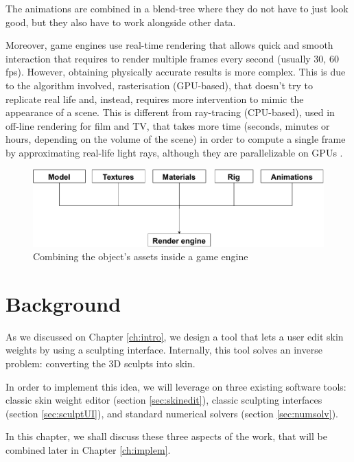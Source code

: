\documentclass[12pt,twoside]{report}
\begin{document}
The animations are combined in a blend-tree where they do not have to just look good, but they also have to work alongside other data.

Moreover, game engines use real-time rendering that allows quick and smooth interaction that requires to render multiple frames every second (usually 30, 60 fps). However, obtaining physically accurate results is more complex. This is due to the algorithm involved, rasterisation (GPU-based), that doesn't try to replicate real life and, instead, requires more intervention to mimic the appearance of a scene. This is different from ray-tracing (CPU-based), used in off-line rendering for film and TV, that takes more time (seconds, minutes or hours, depending on the volume of the scene) in order to compute a single frame by approximating real-life light rays, although they are parallelizable on GPUs \cite{ludvigsen2010real}.

\begin{figure}[hp]
    \centering
    \includegraphics[width=\textwidth]{graphics/workflow_engine.pdf}
    \caption{Combining the object's assets inside a game engine}
    \label{fig:gameEngineCombine}
\end{figure}

\chapter{Background}
As we discussed on Chapter \ref{ch:intro}, we design a tool that lets a user edit skin weights by using a sculpting  interface. Internally, this tool solves an inverse problem: converting the 3D sculpts into skin.

In order to implement this idea, we will leverage on three existing software tools: classic skin weight editor (section \ref{sec:skinedit}), classic sculpting interfaces (section \ref{sec:sculptUI}), and standard numerical solvers (section \ref{sec:numsolv}). 

In this chapter, we shall discuss these three aspects of the work, that will be combined later in Chapter \ref{ch:implem}.
\end{document}
